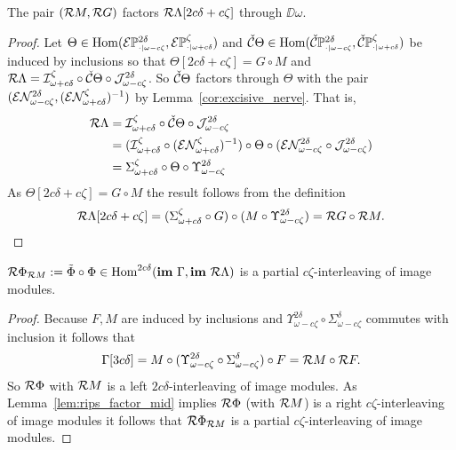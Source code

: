 \begin{lemma}\label{lem:rips_factor_mid}
  The pair $(\mathcal{R} M, \mathcal{R} G)$ factors $\mathcal{R}\Lambda[2c\delta+c\zeta]$ through $\DD{\omega}$.
\end{lemma}
\begin{proof}
  Let $\Theta\in\mathrm{Hom}(\mathcal{E} \mathbb{P}_{\scriptscriptstyle \cdot\mid \omega-c\zeta}^{2\delta},\mathcal{E} \mathbb{P}_{\scriptscriptstyle \cdot\mid \omega+c\delta}^{\zeta})$ and $\check{\mathcal{C}}\Theta\in\mathrm{Hom}(\check{\mathcal{C}}\mathbb{P}_{\scriptscriptstyle \cdot\mid \omega-c\zeta}^{2\delta}, \check{\mathcal{C}}\mathbb{P}_{\scriptscriptstyle \cdot\mid \omega+c\delta}^{\zeta})$ be induced by inclusions so that $\Theta[2c\delta+c\zeta] = G\circ M$ and $\mathcal{R}\Lambda = \mathcal{I}_{\omega+c\delta}^\zeta\circ\check{\mathcal{C}}\Theta\circ\mathcal{J}_{\omega-c\zeta}^{2\delta}$.
  So $\check{\mathcal{C}}\Theta$ factors through $\Theta$ with the pair $(\mathcal{E}\mathcal{N}_{\omega-c\zeta}^{2\delta}, (\mathcal{E}\mathcal{N}_{\omega+c\delta}^\zeta)^{-1})$ by Lemma~\ref{cor:excisive_nerve}.
  That is,
  \begin{align*}
    \mathcal{R}\Lambda &= \mathcal{I}_{\omega+c\delta}^\zeta\circ\check{\mathcal{C}}\Theta\circ\mathcal{J}_{\omega-c\zeta}^{2\delta}\\
      &= (\mathcal{I}_{\omega+c\delta}^\zeta\circ (\mathcal{E}\mathcal{N}_{\omega+c\delta}^\zeta)^{-1})\circ \Theta\circ (\mathcal{E}\mathcal{N}_{\omega-c\zeta}^{2\delta}\circ \mathcal{J}_{\omega-c\zeta}^{2\delta})\\
      &= \Sigma_{\omega+c\delta}^\zeta\circ \Theta\circ \Upsilon_{\omega-c\zeta}^{2\delta}\\
  \end{align*}
  As $\Theta[2c\delta+c\zeta] = G\circ M$ the result follows from the definition
  \[ \mathcal{R}\Lambda[2c\delta+c\zeta] = (\Sigma_{\omega+c\delta}^\zeta\circ G)\circ (M\circ \Upsilon_{\omega-c\zeta}^{2\delta}) = \mathcal{R} G\circ \mathcal{R} M.\]
\end{proof}

\begin{corollary}\label{cor:rips_inter_left}
  $\mathcal{R} \Phi_{\mathcal{R} M} := \tilde{\Phi}\circ \Phi\in\mathrm{Hom}^{2c\delta}(\mathbf{im}~\Gamma,\mathbf{im}~\mathcal{R}\Lambda)$ is a partial $c\zeta$-interleaving of image modules.
\end{corollary}
\begin{proof}
  Because $F,M$ are induced by inclusions and $\Upsilon_{\omega-c\zeta}^{2\delta}\circ \Sigma_{\omega-c\zeta}^{\delta}$ commutes with inclusion it follows that
  \[\Gamma[3c\delta] = M\circ (\Upsilon_{\omega-c\zeta}^{2\delta}\circ \Sigma_{\omega-c\zeta}^{\delta})\circ F = \mathcal{R} M\circ \mathcal{R} F.\]
  So $\mathcal{R}\Phi$ with $\mathcal{R} M$ is a left $2c\delta$-interleaving of image modules.
  As Lemma~\ref{lem:rips_factor_mid} implies $\mathcal{R} \Phi$ (with $\mathcal{R} M$) is a right $c\zeta$-interleaving of image modules it follows that $\mathcal{R} \Phi_{\mathcal{R} M}$ is a partial $c\zeta$-interleaving of image modules.
\end{proof}

